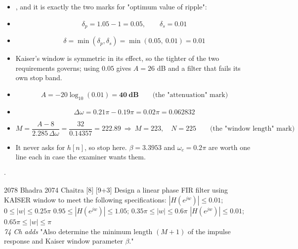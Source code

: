 \begin{itemize}
  \item {}, and
        it is exactly the two marks for "optimum value of ripple":
  \item[] \[ \delta_p=1.05-1=0.05,\qquad \delta_s=0.01 \]
  \item[] \[ \delta=\min(\delta_p,\delta_s)=\min(0.05,\ 0.01)=\mathbf{0.01} \]
  \item {} Kaiser's window is
        symmetric in its effect, so the tighter of the two requirements governs; using
        $0.05$ gives $A=26$ dB and a filter that fails its own stop band.
  \item[] \[ A=-20\log_{10}(0.01)=\mathbf{40\ \text{dB}}
             \qquad\text{(the "attenuation" mark)} \]
  \item[] \[ \Delta\omega=0.21\pi-0.19\pi=0.02\pi=0.062832 \]
  \item[] \[ M=\frac{A-8}{2.285\,\Delta\omega}=\frac{32}{0.14357}=222.89
             \ \Rightarrow\ M=223,\quad \boxed{N=225}
             \qquad\text{(the "window length" mark)} \]
  \item It never asks for $h[n]$, so stop here. $\beta=3.3953$ and $\omega_c=0.2\pi$ are
        worth one line each in case the examiner wants them.
\end{itemize}

{\color{sub}\footnotesize {}
\gap$\cdot$\gap {}}

\begin{asked}{2078 Bhadra \textperiodcentered{} 2074 Chaitra \textperiodcentered{} [8] [9+3]}
Design a linear phase FIR filter using KAISER window to meet the following
specifications:\newline
$|H(e^{jw})|\le0.01$; \quad $0\le|w|\le0.25\pi$\newline
$0.95\le|H(e^{jw})|\le1.05$; \quad $0.35\pi\le|w|\le0.6\pi$\newline
$|H(e^{jw})|\le0.01$; \quad $0.65\pi\le|w|\le\pi$\\
\textit{74 Ch adds} "Also determine the minimum length $(M+1)$ of the impulse response
and Kaiser window parameter $\beta$."
\end{asked}

